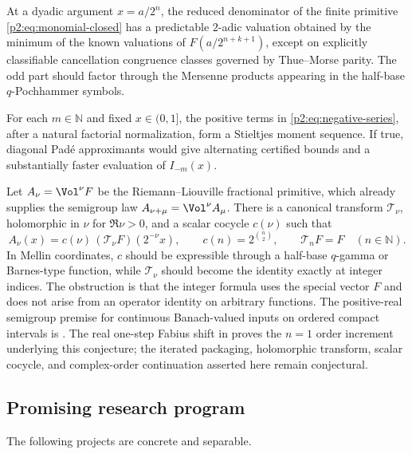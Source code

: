 \documentclass[11pt,oneside]{article}
\theoremstyle{definition}
\theoremstyle{remark}
\newcommand{\N}{\mathbb N}
\newcommand{\1}{\mathbf 1}
\begin{document}
\begin{conjecture}
\label{p2:conj:denominator}
At a dyadic argument $x=a/2^n$, the reduced denominator of the finite primitive
\eqref{p2:eq:monomial-closed} has a predictable $2$-adic valuation obtained by the
minimum of the known valuations of
$F(a/2^{n+k+1})$, except on explicitly classifiable cancellation congruence
classes governed by Thue--Morse parity.  The odd part should factor through the
Mersenne products appearing in the half-base $q$-Pochhammer symbols.
\end{conjecture}

\begin{conjecture}
\label{p2:conj:stieltjes}
For each $m\in\N$ and fixed $x\in(0,1]$, the positive terms in
\eqref{p2:eq:negative-series}, after a natural factorial normalization, form a
Stieltjes moment sequence.  If true, diagonal Pad\'e approximants would give
alternating certified bounds and a substantially faster evaluation of
$I_{-m}(x)$.
\end{conjecture}

\begin{conjecture}
\label{p2:conj:fractional-index}
Let $A_\nu=\Vol^\nu F$ be the Riemann--Liouville fractional primitive, which
already supplies the semigroup law $A_{\nu+\mu}=\Vol^\nu A_\mu$.  There is a
canonical transform $\mathscr T_\nu$, holomorphic in $\nu$ for $\Re\nu>0$, and
a scalar cocycle $c(\nu)$ such that
\[
 A_\nu(x)=c(\nu)\,(\mathscr T_\nu F)(2^{-\nu}x),
 \qquad c(n)=2^{\binom n2},\qquad \mathscr T_nF=F
 \quad(n\in\N).
\]
In Mellin coordinates, $c$ should be expressible through a half-base
$q$-gamma or Barnes-type function, while $\mathscr T_\nu$ should become the
identity exactly at integer indices.  The obstruction is that the integer
formula uses the special vector $F$ and does not arise from an operator
identity on arbitrary functions.
The positive-real semigroup premise for continuous Banach-valued inputs on ordered compact
intervals is .  The real one-step Fabius shift in
 proves the $n=1$ order increment underlying
this conjecture; the iterated packaging, holomorphic transform, scalar cocycle, and
complex-order continuation asserted here remain conjectural.
\end{conjecture}

\subsection{Promising research program}
The following projects are concrete and separable.
\end{document}
